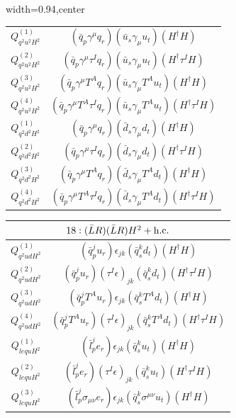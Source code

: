 \begin{table}[H]
\begin{center}
\begin{adjustbox}{width=0.94\textwidth,center}
\begin{minipage}[t]{6.9cm}
\begin{tabular}[t]{c|c}
%
$Q_{q^2u^2H^2}^{(1)}$  &  $(\bar q_p \gamma^\mu q_r) (\bar u_s \gamma_\mu u_t) (H^\dag H)$ \\ 
%
$Q_{q^2u^2H^2}^{(2)}$  &  $(\bar q_p \gamma^\mu \tau^I q_r) (\bar u_s \gamma_\mu u_t) (H^\dag \tau^I H)$ \\ 
%
$Q_{q^2u^2H^2}^{(3)}$  &  $(\bar q_p \gamma^\mu T^A q_r) (\bar u_s \gamma_\mu T^A u_t) (H^\dag H)$ \\ 
%
$Q_{q^2u^2H^2}^{(4)}$  &  $(\bar q_p \gamma^\mu T^A \tau^I q_r) (\bar u_s \gamma_\mu T^A u_t) (H^\dag \tau^I H)$ \\ 
%
$Q_{q^2d^2H^2}^{(1)}$  &  $(\bar q_p \gamma^\mu q_r) (\bar d_s \gamma_\mu d_t) (H^\dag H)$ \\
%
$Q_{q^2d^2H^2}^{(2)}$  &  $(\bar q_p \gamma^\mu \tau^I q_r) (\bar d_s \gamma_\mu d_t) (H^\dag \tau^I H)$ \\
%
$Q_{q^2d^2H^2}^{(3)}$  &  $(\bar q_p \gamma^\mu T^A q_r) (\bar d_s \gamma_\mu T^A d_t) (H^\dag H)$ \\
%
$Q_{q^2d^2H^2}^{(4)}$  &  $(\bar q_p \gamma^\mu T^A \tau^I q_r) (\bar d_s \gamma_\mu T^A d_t) (H^\dag \tau^I H)$ 
\end{tabular}
\end{minipage}
\hspace{1cm}
\begin{minipage}[t]{6.2cm}
\renewcommand{\arraystretch}{1.5}
\begin{tabular}[t]{c|c}
\multicolumn{2}{c}{\boldmath$18:(\bar L R)(\bar L R)H^2 + \mathrm{h.c.}$} \\
\hline
$Q_{q^2udH^2}^{(1)}$  &  $(\bar q_p^j u_r) \epsilon_{jk} (\bar q_s^k d_t) (H^\dag H)$ \\
%
$Q_{q^2udH^2}^{(2)}$  &  $(\bar q_p^j u_r) (\tau^I\epsilon)_{jk} (\bar q_s^k d_t) (H^\dag \tau^I H)$ \\
%
$Q_{q^2udH^2}^{(3)}$  &  $(\bar q_p^j T^A u_r) \epsilon_{jk} (\bar q_s^k T^A d_t) (H^\dag H)$ \\
%
$Q_{q^2udH^2}^{(4)}$  &  $(\bar q_p^j T^A u_r) (\tau^I\epsilon)_{jk} (\bar q_s^k T^A d_t) (H^\dag \tau^I H)$ \\
%
$Q_{lequH^2}^{(1)}$  &  $(\bar l_p^j e_r) \epsilon_{jk} (\bar q_s^k u_t) (H^\dag H)$ \\
%
$Q_{lequH^2}^{(2)}$  &  $(\bar l_p^j e_r) (\tau^I\epsilon)_{jk} (\bar q_s^k u_t) (H^\dag \tau^I H)$ \\
%
$Q_{lequH^2}^{(3)}$  &  $(\bar l_p^j \sigma_{\mu\nu} e_r) \epsilon_{jk} (\bar q_s^k \sigma^{\mu\nu} u_t) (H^\dag H)$ \\ 

\end{tabular}
\end{minipage}
\end{adjustbox}
\end{center}
\end{table}
